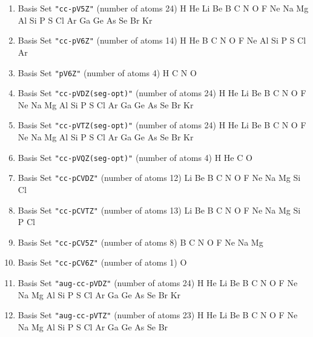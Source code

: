 \begin{enumerate}
\item Basis Set \verb#"cc-pV5Z"# (number of atoms 24)  \newline
  H He Li Be B C N O F Ne Na Mg Al Si P S Cl Ar Ga Ge As Se Br Kr


\item Basis Set \verb#"cc-pV6Z"# (number of atoms 14)  \newline
  H He B C N O F Ne Al Si P S Cl Ar


\item Basis Set \verb#"pV6Z"# (number of atoms 4)  \newline
  H C N O


\item Basis Set \verb#"cc-pVDZ(seg-opt)"# (number of atoms 24)  \newline
  H He Li Be B C N O F Ne Na Mg Al Si P S Cl Ar Ga Ge As Se Br Kr


\item Basis Set \verb#"cc-pVTZ(seg-opt)"# (number of atoms 24)  \newline
  H He Li Be B C N O F Ne Na Mg Al Si P S Cl Ar Ga Ge As Se Br Kr


\item Basis Set \verb#"cc-pVQZ(seg-opt)"# (number of atoms 4)  \newline
  H He C O

\item Basis Set \verb#"cc-pCVDZ"# (number of atoms 12)  \newline
  Li Be B C N O F Ne Na Mg Si Cl


\item Basis Set \verb#"cc-pCVTZ"# (number of atoms 13)  \newline
  Li Be B C N O F Ne Na Mg Si P Cl


\item Basis Set \verb#"cc-pCV5Z"# (number of atoms 8)  \newline
  B C N O F Ne Na Mg


\item Basis Set \verb#"cc-pCV6Z"# (number of atoms 1)  \newline
  O


\item Basis Set \verb#"aug-cc-pVDZ"# (number of atoms 24)  \newline
  H He Li Be B C N O F Ne Na Mg Al Si P S Cl Ar Ga Ge As Se Br Kr


\item Basis Set \verb#"aug-cc-pVTZ"# (number of atoms 23)  \newline
  H He Li Be B C N O F Ne Na Mg Al Si P S Cl Ar Ga Ge As Se Br



\end{enumerate}
